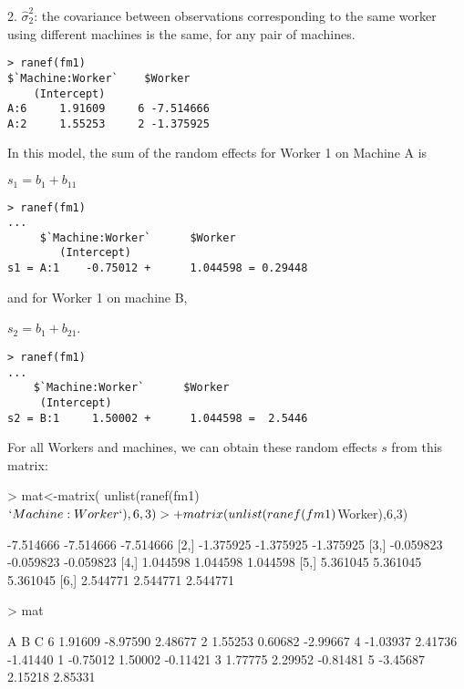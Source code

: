 \documentclass[12pt]{amsart}
\begin{document}
2. $\hat{\sigma}_2^2$: the covariance between observations corresponding to the same worker using different machines is the same, for any pair of machines.


\begin{verbatim}
> ranef(fm1)
$`Machine:Worker`    $Worker
    (Intercept)
A:6     1.91609     6 -7.514666
A:2     1.55253     2 -1.375925
\end{verbatim}

In this model, the sum of the random effects for Worker 1 on Machine A is

$s_1 = b_1 + b_{11}$

\begin{verbatim}
> ranef(fm1)
...
     $`Machine:Worker`      $Worker
        (Intercept)
s1 = A:1    -0.75012 +      1.044598 = 0.29448
\end{verbatim}

and for Worker 1 on machine B,

$s_2 = b_1 + b_{21}$.

\begin{verbatim}
> ranef(fm1)
...
    $`Machine:Worker`      $Worker
     (Intercept)
s2 = B:1     1.50002 +      1.044598 =  2.5446
\end{verbatim}

For all Workers and machines, we can obtain these random effects $s$ from this matrix:

\begin{Schunk}
\begin{Sinput}
> mat<-matrix(
     unlist(ranef(fm1)$`Machine:Worker`),6,3) 
> + 
     matrix(unlist(ranef(fm1)$Worker),6,3)
\end{Sinput}
\begin{Soutput}
          [,1]      [,2]      [,3]
[1,] -7.514666 -7.514666 -7.514666
[2,] -1.375925 -1.375925 -1.375925
[3,] -0.059823 -0.059823 -0.059823
[4,]  1.044598  1.044598  1.044598
[5,]  5.361045  5.361045  5.361045
[6,]  2.544771  2.544771  2.544771
\end{Soutput}
\end{Schunk}

\begin{Schunk}
\begin{Sinput}
> mat
\end{Sinput}
\begin{Soutput}
         A        B        C
6  1.91609 -8.97590  2.48677
2  1.55253  0.60682 -2.99667
4 -1.03937  2.41736 -1.41440
1 -0.75012  1.50002 -0.11421
3  1.77775  2.29952 -0.81481
5 -3.45687  2.15218  2.85331
\end{Soutput}
\end{Schunk}
\end{document}
